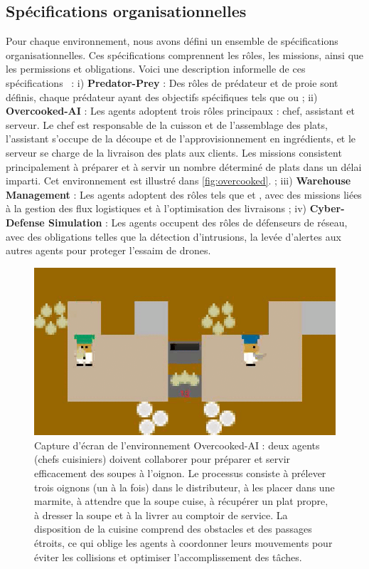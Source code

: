 \documentclass[francais,ROIA,Unicode,manuscript]{cedram}
\begin{document}
\subsection{Spécifications organisationnelles}

Pour chaque environnement, nous avons défini un ensemble de spécifications organisationnelles. Ces spécifications comprennent les rôles, les missions, ainsi que les permissions et obligations. Voici une description informelle de ces spécifications~\hyperref[fn:github]{\footnotemark[2]} :
%
i) \textbf{Predator-Prey} : Des rôles de prédateur et de proie sont définis, chaque prédateur ayant des objectifs spécifiques tels que  ou 
; \quad
ii) \textbf{Overcooked-AI} : Les agents adoptent trois rôles principaux : chef, assistant et serveur. Le chef est responsable de la cuisson et de l'assemblage des plats, l'assistant s'occupe de la découpe et de l'approvisionnement en ingrédients, et le serveur se charge de la livraison des plats aux clients. Les missions consistent principalement à préparer et à servir un nombre déterminé de plats dans un délai imparti. Cet environnement est illustré dans \autoref{fig:overcooked}.
; \quad
iii) \textbf{Warehouse Management} : Les agents adoptent des rôles tels que  et , avec des missions liées à la gestion des flux logistiques et à l'optimisation des livraisons
; \quad
iv) \textbf{Cyber-Defense Simulation} : Les agents occupent des rôles de défenseurs de réseau, avec des obligations telles que la détection d'intrusions, la levée d'alertes aux autres agents pour proteger l'essaim de drones.

\begin{figure}[h!]
    \centering
    \includegraphics[trim=0cm -0.5cm 0cm -0.5cm, clip, width=0.9\linewidth]{figures/overcooked.png}
    \caption[Capture d'écran de l'environnement Overcooked-AI]{Capture d'écran de l'environnement Overcooked-AI : deux agents (chefs cuisiniers) doivent collaborer pour préparer et servir efficacement des soupes à l'oignon. Le processus consiste à prélever trois oignons (un à la fois) dans le distributeur, à les placer dans une marmite, à attendre que la soupe cuise, à récupérer un plat propre, à dresser la soupe et à la livrer au comptoir de service. La disposition de la cuisine comprend des obstacles et des passages étroits, ce qui oblige les agents à coordonner leurs mouvements pour éviter les collisions et optimiser l'accomplissement des tâches.}
    \label{fig:overcooked}
\end{figure}
\end{document}

